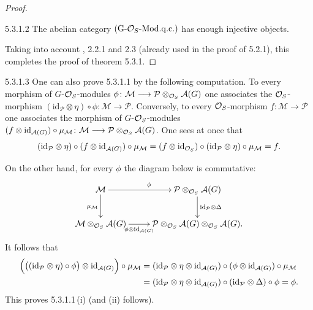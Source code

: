 \begin{proof}
\begin{corollary}{5.3.1.2}
\label{I.5.3.1.2}
The abelian category \((\mathrm{G}\text{-}\mathcal{O}_S\text{-}\mathrm{Mod.q.c.})\) has
enough injective objects.
\end{corollary}

Taking into account \cite{Gr57}, 2.2.1 and 2.3 (already used in the proof of
5.2.1), this completes the proof of theorem 5.3.1.
\end{proof}

\begin{remark}{5.3.1.3}
\label{I.5.3.1.3}
One can also prove 5.3.1.1 by the following computation. To every morphism of
\(G\)-\(\mathcal{O}_S\)-modules
\(\phi\colon\mathcal{M}\longrightarrow\mathcal{P}\otimes_{\mathcal{O}_S}\mathcal{A}(G)\) one
associates the \(\mathcal{O}_S\)-morphism
\((\mathrm{id}_{\mathcal{P}}\otimes\eta)\circ\phi\colon\mathcal{M}\to\mathcal{P}\).
Conversely, to every \(\mathcal{O}_S\)-morphism \(f\colon\mathcal{M}\to\mathcal{P}\) one
associates the morphism of \(G\)-\(\mathcal{O}_S\)-modules
\((f\otimes\mathrm{id}_{\mathcal{A}(G)})\circ\mu_{\mathcal{M}}\colon\mathcal{M}\longrightarrow\mathcal{P}\otimes_{\mathcal{O}_S}\mathcal{A}(G)\).
One sees at once that
\begin{equation*}
(\mathrm{id}_{\mathcal{P}}\otimes\eta)\circ(f\otimes\mathrm{id}_{\mathcal{A}(G)})\circ\mu_{\mathcal{M}}
=(f\otimes\mathrm{id}_{\mathcal{O}_S})\circ(\mathrm{id}_{\mathcal{P}}\otimes\eta)\circ\mu_{\mathcal{M}}
=f.
\end{equation*}

On the other hand, for every \(\phi\) the diagram below is commutative:
\[
\xymatrix{
\mathcal{M} \ar[r]^{\phi} \ar[d]_{\mu_{\mathcal{M}}}
  & \mathcal{P}\otimes_{\OS}\mathcal{A}(G) \ar[d]^{\mathrm{id}_{\mathcal{P}}\otimes\Delta} \\
\mathcal{M}\otimes_{\OS}\mathcal{A}(G) \ar[r]_-{\phi\otimes\mathrm{id}_{\mathcal{A}(G)}}
  & \mathcal{P}\otimes_{\OS}\mathcal{A}(G)\otimes_{\OS}\mathcal{A}(G).
}
\]
It follows that
\begin{align*}
\Bigl(\bigl((\mathrm{id}_{\mathcal{P}}\otimes\eta)\circ\phi\bigr)\otimes\mathrm{id}_{\mathcal{A}(G)}\Bigr)\circ\mu_{\mathcal{M}}
&=(\mathrm{id}_{\mathcal{P}}\otimes\eta\otimes\mathrm{id}_{\mathcal{A}(G)})\circ(\phi\otimes\mathrm{id}_{\mathcal{A}(G)})\circ\mu_{\mathcal{M}}\\
&=(\mathrm{id}_{\mathcal{P}}\otimes\eta\otimes\mathrm{id}_{\mathcal{A}(G)})\circ(\mathrm{id}_{\mathcal{P}}\otimes\Delta)\circ\phi
=\phi.
\end{align*}
This proves 5.3.1.1\,(i) (and (ii) follows).
\end{remark}

